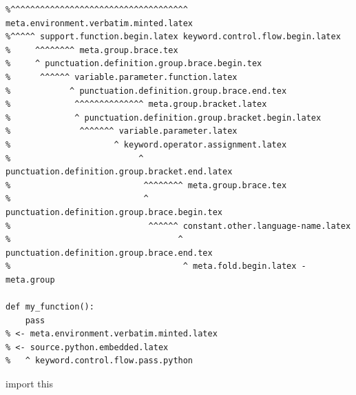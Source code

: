 \documentclass[12pt]{article}
\newcommand\"{quote}
\begin{document}
\begin{verbatim}
%^^^^^^^^^^^^^^^^^^^^^^^^^^^^^^^^^^^^ meta.environment.verbatim.minted.latex
%^^^^^ support.function.begin.latex keyword.control.flow.begin.latex
%     ^^^^^^^^ meta.group.brace.tex
%     ^ punctuation.definition.group.brace.begin.tex
%      ^^^^^^ variable.parameter.function.latex
%            ^ punctuation.definition.group.brace.end.tex
%             ^^^^^^^^^^^^^^ meta.group.bracket.latex
%             ^ punctuation.definition.group.bracket.begin.latex
%              ^^^^^^^ variable.parameter.latex
%                     ^ keyword.operator.assignment.latex
%                          ^ punctuation.definition.group.bracket.end.latex
%                           ^^^^^^^^ meta.group.brace.tex
%                           ^ punctuation.definition.group.brace.begin.tex
%                            ^^^^^^ constant.other.language-name.latex
%                                  ^ punctuation.definition.group.brace.end.tex
%                                   ^ meta.fold.begin.latex - meta.group

def my_function():
    pass
% <- meta.environment.verbatim.minted.latex
% <- source.python.embedded.latex
%   ^ keyword.control.flow.pass.python

\end{verbatim}


 {
  import this
}
\end{document}
